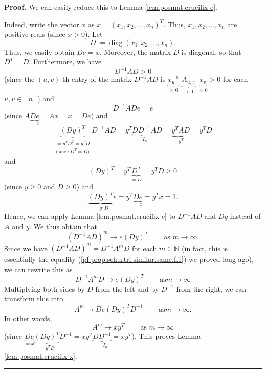 \documentclass[numbers=enddot,12pt,final,onecolumn,notitlepage]{scrartcl}%
\numberwithin{exer}{subsection}
\theoremstyle{definition}
\newenvironment{proof}[1][Proof]{\noindent\textbf{#1.} }{\ \rule{0.5em}{0.5em}}
\begin{document}
\begin{proof}
We can easily reduce this to Lemma \ref{lem.posmat.crucifix-e}.

Indeed, write the vector $x$ as $x=\left(  x_{1},x_{2},\ldots,x_{n}\right)
^{T}$. Thus, $x_{1},x_{2},\ldots,x_{n}$ are positive reals (since $x>0$). Let%
\[
D:=\operatorname*{diag}\left(  x_{1},x_{2},\ldots,x_{n}\right)  .
\]
Thus, we easily obtain $De=x$. Moreover, the matrix $D$ is diagonal, so that
$D^{T}=D$. Furthermore, we have
\[
D^{-1}AD>0
\]
(since the $\left(  u,v\right)  $-th entry of the matrix $D^{-1}AD$ is
$\underbrace{x_{u}^{-1}}_{>0}\ \ \underbrace{A_{u,v}}_{>0}%
\ \ \underbrace{x_{v}}_{>0}>0$ for each $u,v\in\left[  n\right]  $) and%
\[
D^{-1}ADe=e
\]
(since $A\underbrace{De}_{=x}=Ax=x=De$) and
\[
\underbrace{\left(  Dy\right)  ^{T}}_{\substack{=y^{T}D^{T}=y^{T}%
D\\\text{(since }D^{T}=D\text{)}}}D^{-1}AD=y^{T}\underbrace{DD^{-1}}_{=I_{n}%
}AD=\underbrace{y^{T}A}_{=y^{T}}D=y^{T}D
\]
and%
\[
\left(  Dy\right)  ^{T}=y^{T}\underbrace{D^{T}}_{=D}=y^{T}D\geq0
\]
(since $y\geq0$ and $D\geq0$) and%
\[
\underbrace{\left(  Dy\right)  ^{T}}_{=y^{T}D}e=y^{T}\underbrace{De}%
_{=x}=y^{T}x=1.
\]
Hence, we can apply Lemma \ref{lem.posmat.crucifix-e} to $D^{-1}AD$ and $Dy$
instead of $A$ and $y$. We thus obtain that%
\[
\left(  D^{-1}AD\right)  ^{m}\rightarrow e\left(  Dy\right)  ^{T}%
\ \ \ \ \ \ \ \ \ \ \text{as }m\rightarrow\infty.
\]
Since we have $\left(  D^{-1}AD\right)  ^{m}=D^{-1}A^{m}D$ for each
$m\in\mathbb{N}$ (in fact, this is essentially the equality
(\ref{pf.prop.schurtri.similar.same.f.1}) we proved long ago), we can rewrite
this as%
\[
D^{-1}A^{m}D\rightarrow e\left(  Dy\right)  ^{T}\ \ \ \ \ \ \ \ \ \ \text{as
}m\rightarrow\infty
\]
Multiplying both sides by $D$ from the left and by $D^{-1}$ from the right, we
can transform this into%
\[
A^{m}\rightarrow De\left(  Dy\right)  ^{T}D^{-1}\ \ \ \ \ \ \ \ \ \ \text{as
}m\rightarrow\infty.
\]
In other words,%
\[
A^{m}\rightarrow xy^{T}\ \ \ \ \ \ \ \ \ \ \text{as }m\rightarrow\infty
\]
(since $\underbrace{De}_{=x}\underbrace{\left(  Dy\right)  ^{T}}_{=y^{T}%
D}D^{-1}=xy^{T}\underbrace{DD^{-1}}_{=I_{n}}=xy^{T}$). This proves Lemma
\ref{lem.posmat.crucifix-x}.
\end{proof}
\end{document}
